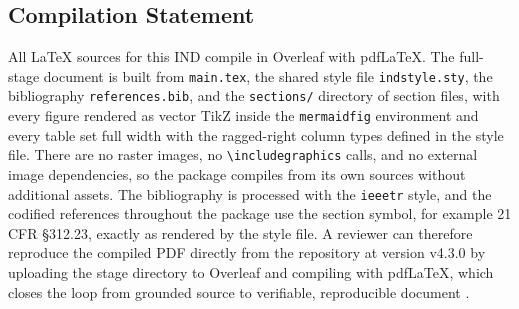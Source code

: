 \subsection{Compilation Statement}

All LaTeX sources for this IND compile in Overleaf with pdfLaTeX. The full-stage
document is built from \texttt{main.tex}, the shared style file
\texttt{indstyle.sty}, the bibliography \texttt{references.bib}, and the
\texttt{sections/} directory of section files, with every figure rendered as vector
TikZ inside the \texttt{mermaidfig} environment and every table set full width with
the ragged-right column types defined in the style file. There are no raster images,
no \texttt{\textbackslash includegraphics} calls, and no external image
dependencies, so the package compiles from its own sources without additional
assets. The bibliography is processed with the \texttt{ieeetr} style, and the
codified references throughout the package use the section symbol, for example 21
CFR \S 312.23, exactly as rendered by the style file. A reviewer can therefore
reproduce the compiled PDF directly from the repository at version v4.3.0 by
uploading the stage directory to Overleaf and compiling with pdfLaTeX, which closes
the loop from grounded source to verifiable, reproducible document
\cite{phase1guidance, daraxwhipple}.
